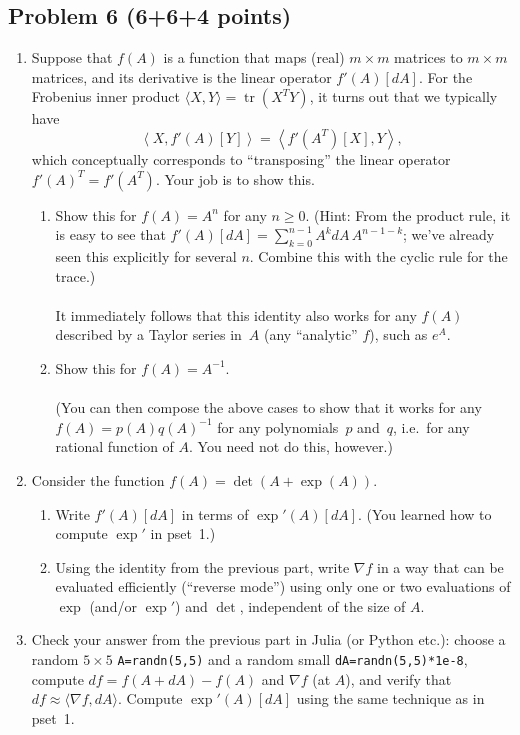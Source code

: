 \documentclass[10pt,oneside]{article}
\newcommand{\tr}{\operatorname{tr}}
\begin{document}
\subsection*{Problem 6 (6+6+4 points)}
\begin{enumerate}
\item Suppose that $f(A)$ is a function that maps (real) $m\times m$ matrices
to $m\times m$ matrices, and its derivative is the linear operator
$f'(A)[dA]$. For the Frobenius inner product $\langle X,Y\rangle=\tr(X^{T}Y)$,
it turns out that we typically have 
\[
\left\langle X,f'(A)[Y]\right\rangle =\left\langle f'(A^{T})[X],Y\right\rangle ,
\]
which conceptually corresponds to “transposing” the linear operator
$f'(A)^{T}=f'(A^{T})$. Your job is to show this.
\begin{enumerate}
\item Show this for $f(A)=A^{n}$ for any $n\ge0$. (Hint: From the product
rule, it is easy to see that $f'(A)[dA]=\sum_{k=0}^{n-1}A^{k}dA\,A^{n-1-k}$;
we've already seen this explicitly for several $n$. Combine this
with the cyclic rule for the trace.)\\
\\
It immediately follows that this identity also works for any $f(A)$
described by a Taylor series in~$A$ (any ``analytic'' $f$), such
as $e^{A}$.
\item Show this for $f(A)=A^{-1}$.\\
\\
(You can then compose the above cases to show that it works for any
$f(A)=p(A)q(A)^{-1}$ for any polynomials~$p$ and~$q$, i.e.~for
any rational function of $A$. You need not do this, however.)
\end{enumerate}
\item Consider the function $f(A)=\det(A+\exp(A))$.
\begin{enumerate}
\item Write $f'(A)[dA]$ in terms of $\exp'(A)[dA]$. (You learned how to
compute $\exp'$ in pset~1.)
\item Using the identity from the previous part, write $\nabla f$ in a
way that can be evaluated efficiently (“reverse mode”) using
only one or two evaluations of $\exp$ (and/or $\exp'$) and $\det$,
independent of the size of $A$.
\end{enumerate}
\item Check your answer from the previous part in Julia (or Python etc.):
choose a random $5\times5$ \texttt{A=randn(5,5)} and a random small
\texttt{dA=randn(5,5){*}1e-8}, compute $df=f(A+dA)-f(A)$ and $\nabla f$
(at $A$), and verify that $df\approx\langle\nabla f,dA\rangle$.
Compute $\exp'(A)[dA]$ using the same technique as in pset~1.
\end{enumerate}
\end{document}
